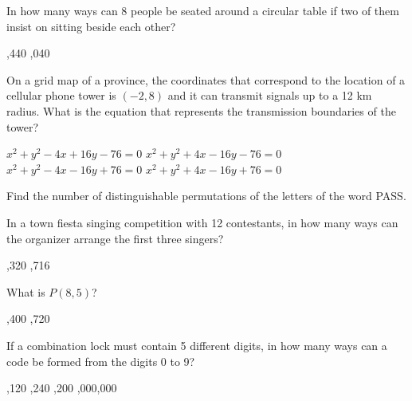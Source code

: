 \begin{questions}
\question In how many ways can 8  people  be  seated  around  a  circular  table  if two  of  them  insist  on  sitting  beside  each  other? 
\begin{multicols}{4}
\begin{choices} 
,440
,040
\end{choices}
\end{multicols} 

\question On a grid map of a province, the coordinates that correspond to the
location of a cellular phone tower is $(-2, 8)$ and it can transmit signals
up to a 12 km radius. What is the equation that represents the transmission boundaries of the tower?

\begin{multicols}{2}
\begin{choices}  
\choice $x^2 + y^2 - 4x + 16y - 76 = 0$ 
\CorrectChoice $x^2 + y^2 + 4x - 16y - 76 = 0$ 
\choice $x^2 + y^2 - 4x - 16y + 76 = 0$ 
\choice $x^2 + y^2 + 4x - 16y + 76 = 0$ 
\end{choices}
\end{multicols} 

\question Find the number of distinguishable  permutations  of  the  letters  of  the word PASS. 
\begin{multicols}{4}
\begin{choices}  
\end{choices}
\end{multicols} 

\question In a town fiesta singing competition with 12 contestants, in how many ways can the organizer arrange the first three singers? 
\begin{multicols}{4}
\begin{choices}  
,320
,716
\end{choices}
\end{multicols} 

\question What is $P(8, 5)$? 

\begin{multicols}{4}
\begin{choices}  
,400
,720   
\end{choices}
\end{multicols} 

\question If a combination lock must contain 5 different digits, in how many ways can a code be formed from the digits 0 to 9? 
\begin{multicols}{4}
\begin{choices} 
,120
,240
,200
,000,000  
\end{choices}
\end{multicols} 


\end{questions}

